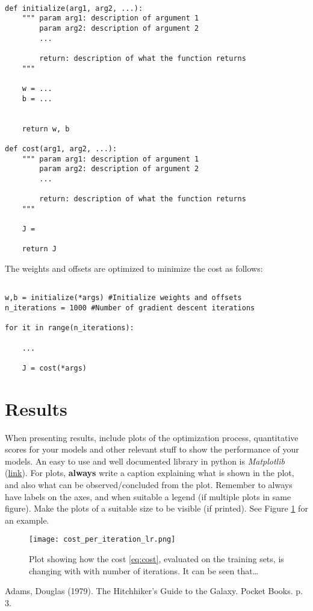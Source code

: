 \documentclass[a4paper,10pt]{article}
\begin{document}
\begin{verbatim}

def initialize(arg1, arg2, ...):
    """ param arg1: description of argument 1
        param arg2: description of argument 2
        ...
        
        return: description of what the function returns
    """
    
    w = ...
    b = ...
    
    
    return w, b

def cost(arg1, arg2, ...):
    """ param arg1: description of argument 1
        param arg2: description of argument 2
        ...
        
        return: description of what the function returns
    """
    
    J = 
    
    return J

\end{verbatim}

\newpage
\hfill \break
The weights and offsets are optimized to minimize the cost as follows:

\begin{verbatim}

w,b = initialize(*args) #Initialize weights and offsets
n_iterations = 1000 #Number of gradient descent iterations

for it in range(n_iterations):
    
    ...
    
    J = cost(*args)
\end{verbatim}


\section{Results}
When presenting results, include plots of the optimization process, quantitative scores for your models and other relevant stuff to show the performance of your models. An easy to use and well documented library in python is \emph{Matplotlib} (\href{https://matplotlib.org/}{link}). 
For plots, \textbf{always} write a caption explaining what is shown in the plot, and also what can be observed/concluded from the plot. Remember to always have labels on the axes, and when suitable a legend (if multiple plots in same figure). Make the plots of a suitable size to be visible (if printed). See Figure \ref{fig:cost_per_iteration} for an example.


\begin{figure}[H]
 \centering
    \texttt{[image: cost\_per\_iteration\_lr.png]}
    \caption{Plot showing how the cost \eqref{eq:cost}, evaluated on the training sets, is changing with with number of iterations. It can be seen that\ldots}
    \label{fig:cost_per_iteration}
\end{figure}



\begin{thebibliography}{1}

 Adams, Douglas (1979). The Hitchhiker's Guide to the Galaxy. Pocket Books. p. 3.

\end{thebibliography}
\end{document}
